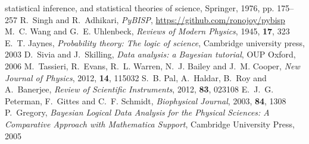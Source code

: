 \documentclass[english,aps, onecolumn, prl,superscriptaddress, notitlepage]{revtex4-1}
\begin{document}
\begin{mcitethebibliography}{17}
{  statistical inference, and statistical theories of science}, Springer, 1976,
  pp. 175--257\relax
\mciteBstWouldAddEndPuncttrue
\mciteSetBstMidEndSepPunct{\mcitedefaultmidpunct}
{\mcitedefaultendpunct}{\mcitedefaultseppunct}\relax
\EndOfBibitem
{}
R.~Singh and R.~Adhikari, \emph{PyBISP},
  \url{https://github.com/ronojoy/pybisp}\relax
\mciteBstWouldAddEndPuncttrue
\mciteSetBstMidEndSepPunct{\mcitedefaultmidpunct}
{\mcitedefaultendpunct}{\mcitedefaultseppunct}\relax
\EndOfBibitem
{}
M.~C. Wang and G.~E. Uhlenbeck, \emph{Reviews of Modern Physics}, 1945,
  \textbf{17}, 323\relax
\mciteBstWouldAddEndPuncttrue
\mciteSetBstMidEndSepPunct{\mcitedefaultmidpunct}
{\mcitedefaultendpunct}{\mcitedefaultseppunct}\relax
\EndOfBibitem
{}
E.~T. Jaynes, \emph{Probability theory: The logic of science}, Cambridge
  university press, 2003\relax
\mciteBstWouldAddEndPuncttrue
\mciteSetBstMidEndSepPunct{\mcitedefaultmidpunct}
{\mcitedefaultendpunct}{\mcitedefaultseppunct}\relax
\EndOfBibitem
{}
D.~Sivia and J.~Skilling, \emph{Data analysis: a Bayesian tutorial}, OUP
  Oxford, 2006\relax
\mciteBstWouldAddEndPuncttrue
\mciteSetBstMidEndSepPunct{\mcitedefaultmidpunct}
{\mcitedefaultendpunct}{\mcitedefaultseppunct}\relax
\EndOfBibitem
{}
M.~Tassieri, R.~Evans, R.~L. Warren, N.~J. Bailey and J.~M. Cooper, \emph{New
  Journal of Physics}, 2012, \textbf{14}, 115032\relax
\mciteBstWouldAddEndPuncttrue
\mciteSetBstMidEndSepPunct{\mcitedefaultmidpunct}
{\mcitedefaultendpunct}{\mcitedefaultseppunct}\relax
\EndOfBibitem
{}
S.~B. Pal, A.~Haldar, B.~Roy and A.~Banerjee, \emph{Review of Scientific
  Instruments}, 2012, \textbf{83}, 023108\relax
\mciteBstWouldAddEndPuncttrue
\mciteSetBstMidEndSepPunct{\mcitedefaultmidpunct}
{\mcitedefaultendpunct}{\mcitedefaultseppunct}\relax
\EndOfBibitem
{}
E.~J.~G. Peterman, F.~Gittes and C.~F. Schmidt, \emph{Biophysical Journal},
  2003, \textbf{84}, 1308\relax
\mciteBstWouldAddEndPuncttrue
\mciteSetBstMidEndSepPunct{\mcitedefaultmidpunct}
{\mcitedefaultendpunct}{\mcitedefaultseppunct}\relax
\EndOfBibitem
{}
P.~Gregory, \emph{Bayesian Logical Data Analysis for the Physical Sciences: A
  Comparative Approach with Mathematica{\textregistered} Support}, Cambridge
  University Press, 2005\relax
\mciteBstWouldAddEndPuncttrue
\mciteSetBstMidEndSepPunct{\mcitedefaultmidpunct}
{\mcitedefaultendpunct}{\mcitedefaultseppunct}\relax
\EndOfBibitem
\end{mcitethebibliography}
\end{document}
